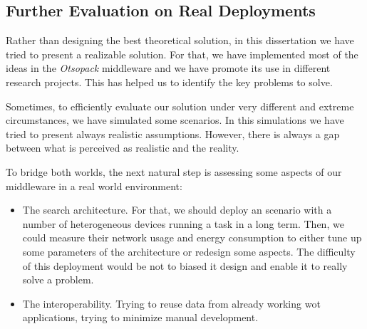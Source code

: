 




\subsection{Further Evaluation on Real Deployments}

Rather than designing the best theoretical solution, in this dissertation we have tried to present a realizable solution.
For that, we have implemented most of the ideas in the \emph{Otsopack} middleware and we have promote its use in different research projects.
This has helped us to identify the key problems to solve.


Sometimes, to efficiently evaluate our solution under very different and extreme circumstances, we have simulated some scenarios. %
In this simulations we have tried to present always realistic assumptions.
However, there is always a gap between what is perceived as realistic and the reality.


To bridge both worlds, the next natural step is assessing some aspects of our middleware in a real world environment: %
\begin{itemize}
  \item The search architecture.
        For that, we should deploy an scenario with a number of heterogeneous devices running a task in a long term.
        Then, we could measure their network usage and energy consumption to either tune up some parameters of the architecture or redesign some aspects.
        The difficulty of this deployment would be not to biased it design and enable it to really solve a problem.
  \item The interoperability.
        Trying to reuse data from already working \ac{wot} applications, trying to minimize manual development.
\end{itemize}


